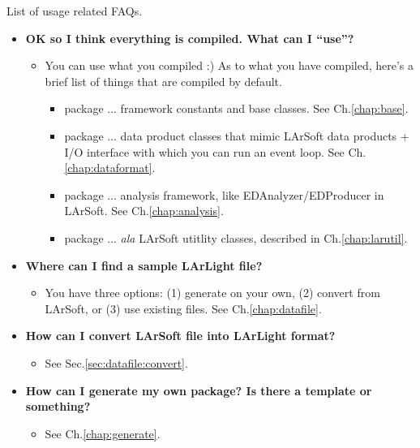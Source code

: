 List of usage related FAQs.

\begin{itemize}

\item[] {\bf OK so I think everything is compiled. What can I ``use''?}
  \begin{itemize}
    \item You can use what you compiled :) As to what you have compiled,
      here's a brief list of things that are compiled by default.
      \begin{itemize}
        \item \Base package ... framework constants and base classes. See Ch.\ref{chap:base}.
        \item \DataFormat package ... data product classes that mimic LArSoft data products + I/O interface with which you can run an event loop. See Ch.\ref{chap:dataformat}.
        \item \Analysis package ... analysis framework, like EDAnalyzer/EDProducer in LArSoft. See Ch.\ref{chap:analysis}.
        \item \LArUtil package ... {\it ala} LArSoft utitlity classes, described in Ch.\ref{chap:larutil}.
      \end{itemize}
  \end{itemize}

\item[] {\bf Where can I find a sample LArLight \ROOT file?}
  \begin{itemize}
    \item You have three options: (1) generate on your own, (2) convert from LArSoft, or (3) use existing files. See Ch.\ref{chap:datafile}.
  \end{itemize}

\item[] {\bf How can I convert LArSoft file into LArLight format?}
  \begin{itemize}
    \item See Sec.\ref{sec:datafile:convert}.
  \end{itemize}

\item[] {\bf How can I generate my own package? Is there a template or something?}
  \begin{itemize}
    \item See Ch.\ref{chap:generate}.
  \end{itemize}


\end{itemize}

